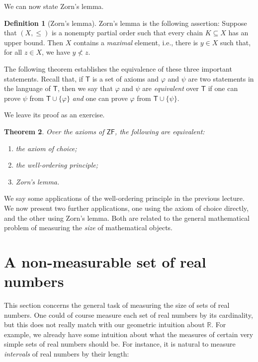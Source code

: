 \documentclass[a4paper]{memoir}
\newtheorem{theorem}{Theorem}[section]
\theoremstyle{definition}
\newtheorem{definition}[theorem]{Definition}
\begin{document}
We can now state Zorn's lemma.

\begin{definition}[Zorn's lemma]
  Zorn's lemma is the following assertion: Suppose that $(X, \leq)$ is a nonempty partial order 
  such that every chain $K \subseteq X$ has an upper bound. Then $X$ contains a \emph{maximal} 
  element, i.e., there is $y \in X$ such that, for all $z \in X$, we have $y \not< z$.
\end{definition}

The following theorem establishes the equivalence of these three important statements.
Recall that, if $\mathsf{T}$ is a set of axioms and $\varphi$ and $\psi$ are two statements 
in the language of $\mathsf{T}$, then we say that $\varphi$ and $\psi$ are \emph{equivalent} 
over $\mathsf{T}$ if one can prove $\psi$ from $\mathsf{T} \cup \{\varphi\}$ \emph{and} one 
can prove $\varphi$ from $\mathsf{T} \cup \{\psi\}$.

 We leave 
its proof as an exercise.

\begin{theorem}
  Over the axioms of $\mathsf{ZF}$, the following are equivalent:
  \begin{enumerate}
    \item the axiom of choice;
    \item the well-ordering principle;
    \item Zorn's lemma.
  \end{enumerate}
\end{theorem}

We say some applications of the well-ordering principle in the previous lecture.
We now present two further applications, one using the axiom of choice directly, and the other 
using Zorn's lemma. Both are related to the general mathematical problem of measuring the 
\emph{size} of mathematical objects.

\section{A non-measurable set of real numbers}

This section concerns the general task of measuring the size of sets of real numbers. 
One could of course measure each set of real numbers by its cardinality, but this does not 
really match with our geometric intuition about $\mathbb{R}$. For example, we already 
have some intuition about what the measures of certain very simple sets of real numbers 
should be. For instance, it is natural to measure \emph{intervals} of real numbers by their 
length:
\end{document}
